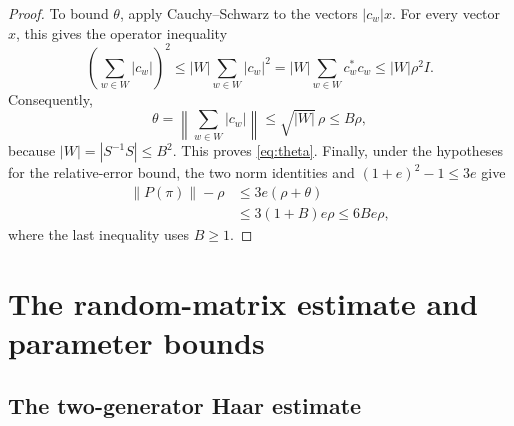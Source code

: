 \documentclass[11pt]{article}
\numberwithin{equation}{section}
\theoremstyle{boldremark}\newtheorem{remark}[theorem]{Remark}
\newcommand{\norm}[1]{\left\lVert #1\right\rVert}
\begin{document}
\begin{proof}
To bound $\theta$, apply Cauchy--Schwarz to the vectors $|c_w|x$.
For every vector $x$, this gives the operator inequality
\[
 \left(\sum_{w\in W}|c_w|\right)^2
 \le |W|\sum_{w\in W}|c_w|^2
 =|W|\sum_{w\in W}c_w^*c_w
 \le |W|\rho^2I.
\]
Consequently,
\[
 \theta=\left\|\sum_{w\in W}|c_w|\right\|
 \le\sqrt{|W|}\,\rho\le B\rho,
\]
because $|W|=|S^{-1}S|\le B^2$. This proves \eqref{eq:theta}.
Finally, under the hypotheses for the relative-error bound, the two
norm identities and $(1+e)^2-1\le3e$ give
\[
 \begin{aligned}
 \norm{P(\pi)}-\rho
 &\le3e(\rho+\theta)\\
 &\le3(1+B)e\rho\le6Be\rho,
 \end{aligned}
\]
where the last inequality uses $B\ge1$.
\end{proof}

\section{The random-matrix estimate and parameter bounds}
\label{app:finite-threshold}

\subsection{The two-generator Haar estimate}
\end{document}
